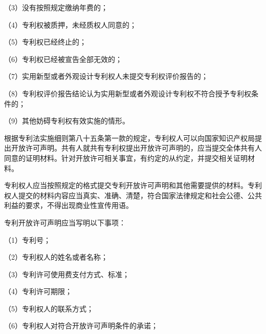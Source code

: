 {\setlength{\parindent}{17.1bp}（3）没有按照规定缴纳年费的；\par}

{\setlength{\parindent}{17.1bp}（4）专利权被质押，未经质权人同意的；\par}

{\setlength{\parindent}{17.1bp}（5）专利权已经终止的；\par}

{\setlength{\parindent}{17.1bp}（6）专利权已经被宣告全部无效的；\par}

{\setlength{\parindent}{17.1bp}（7）实用新型或者外观设计专利权人未提交专利权评价报告的；\par}

{\setlength{\parindent}{17.1bp}（8）专利权评价报告结论认为实用新型或者外观设计专利权不符合授予专利权条件的；\par}

{\setlength{\parindent}{17.1bp}（9）其他妨碍专利权有效实施的情形。\par}

根据专利法实施细则第八十五条第一款的规定，专利权人可以向国家知识产权局提出开放许可声明。共有人就共有专利权提出开放许可声明的，应当提交全体共有人同意的证明材料。针对开放许可相关事宜，有约定的从约定，并提交相关证明材料。

专利权人应当按照规定的格式提交专利开放许可声明和其他需要提供的材料。专利权人提交的材料内容应当真实、准确、清楚，符合国家法律规定和社会公德、公共利益的要求，不得出现商业性宣传用语。

专利开放许可声明应当写明以下事项：

{\setlength{\parindent}{17.1bp}（1）专利号；\par}

{\setlength{\parindent}{17.1bp}（2）专利权人的姓名或者名称；\par}

{\setlength{\parindent}{17.1bp}（3）专利许可使用费支付方式、标准；\par}

{\setlength{\parindent}{17.1bp}（4）专利许可期限；\par}

{\setlength{\parindent}{17.1bp}（5）专利权人的联系方式；\par}

{\setlength{\parindent}{17.1bp}（6）专利权人对符合开放许可声明条件的承诺；\par}

